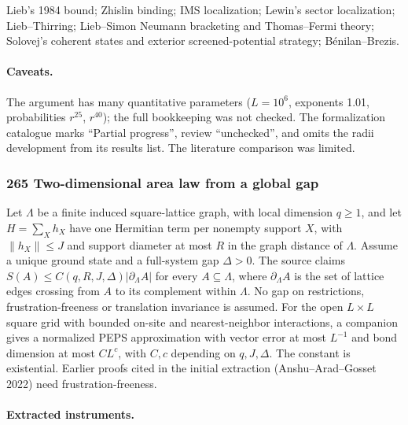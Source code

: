 \documentclass[11pt]{article}
\newcommand{\badges}[1]{\par\noindent{\small\sffamily\color{black!70}#1}\par\smallskip}
\newcommand{\badgesep}{\textbar}
\begin{document}
Lieb's 1984 bound; Zhislin binding; IMS localization; Lewin's sector localization; Lieb--Thirring; Lieb--Simon Neumann bracketing and Thomas--Fermi theory; Solovej's coherent states and exterior screened-potential strategy; Bénilan--Brezis.

\paragraph{Caveats.}

The argument has many quantitative parameters ($L=10^6$, exponents 1.01, probabilities $r^{25}$, $r^{40}$); the full bookkeeping was not checked. The formalization catalogue marks ``Partial progress'', review ``unchecked'', and omits the radii development from its results list. The literature comparison was limited.

\subsubsection{\texorpdfstring{265 \textperiodcentered{} Two-dimensional area law from a global gap}{265 · Two-dimensional area law from a global gap}}\label{fam:265}
\badges{not formalized \badgesep{} new}

Let $\Lambda$ be a finite induced square-lattice graph, with local dimension $q\ge1$, and let $H=\sum_Xh_X$ have one Hermitian term per nonempty support $X$, with $\|h_X\|\le J$ and support diameter at most $R$ in the graph distance of $\Lambda$. Assume a unique ground state and a full-system gap $\Delta>0$. The source claims $S(A)\le C(q,R,J,\Delta)|\partial_\Lambda A|$ for every $A\subseteq\Lambda$, where $\partial_\Lambda A$ is the set of lattice edges crossing from $A$ to its complement within $\Lambda$. No gap on restrictions, frustration-freeness or translation invariance is assumed. For the open $L\times L$ square grid with bounded on-site and nearest-neighbor interactions, a companion gives a normalized PEPS approximation with vector error at most $L^{-1}$ and bond dimension at most $CL^c$, with $C,c$ depending on $q,J,\Delta$. The constant is existential. Earlier proofs cited in the initial extraction (Anshu--Arad--Gosset 2022) need frustration-freeness.

\paragraph{Extracted instruments.}
\end{document}
